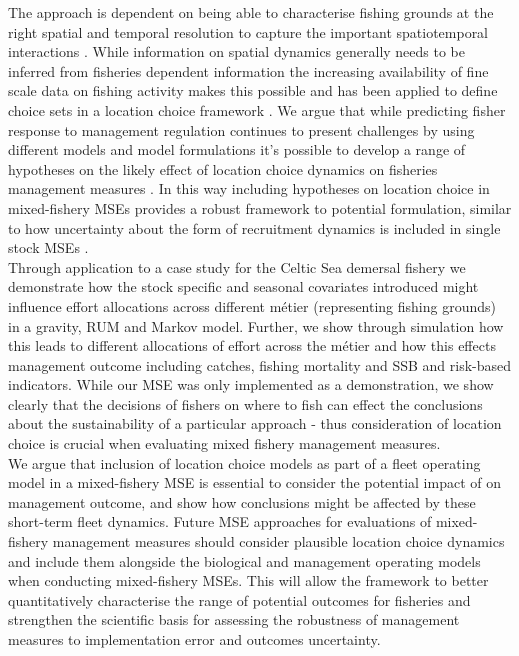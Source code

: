 \documentclass[12pt, halfline, a4paper]{ouparticle}
\begin{document}
The approach is dependent on being able to characterise fishing grounds at the
right spatial and temporal resolution to capture the important spatiotemporal
interactions \citep{Dolder2020a}. While information on spatial dynamics
generally needs to be inferred from fisheries dependent information the
increasing availability of fine scale data on fishing activity makes this
possible \citep{Gerritsen2012, Mateo2016} and has been applied to define choice
sets in a location choice framework \citep{Hynes2016}. We argue that while
predicting fisher response to management regulation continues to present
challenges \citep{Andersen2010a} by using different models and model
formulations it's possible to develop a range of hypotheses on the likely
effect of location choice dynamics on fisheries management measures
\citep[][\textit{in prep}]{Dolder2020}. In this way including hypotheses on
location choice in mixed-fishery MSEs provides a robust framework to potential
formulation, similar to how uncertainty about the form of recruitment dynamics
is included in single stock MSEs \citep[e.g.][]{ICES2020}.  \\

Through application to a case study for the Celtic Sea demersal fishery we
demonstrate how the stock specific and seasonal covariates introduced might
influence effort allocations across different métier (representing fishing
grounds) in a gravity, RUM and Markov model. Further, we show through
simulation how this leads to different allocations of effort across the métier
and how this effects management outcome including catches, fishing mortality
and SSB and risk-based indicators. While our MSE was only implemented as a
demonstration, we show clearly that the decisions of fishers on where to fish
can effect the conclusions about the sustainability of a particular approach -
thus consideration of location choice is crucial when evaluating mixed fishery
management measures. \\

We argue that inclusion of location choice models as part of a fleet operating
model in a mixed-fishery MSE is essential to consider the potential impact of
on management outcome, and show how conclusions might be affected by these
short-term fleet dynamics. Future MSE approaches for evaluations of
mixed-fishery management measures should consider plausible location choice
dynamics and include them alongside the biological and management operating
models when conducting mixed-fishery MSEs. This will allow the framework to
better quantitatively characterise the range of potential outcomes for
fisheries and strengthen the scientific basis for assessing the robustness of
management measures to implementation error and outcomes uncertainty. 
\end{document}
